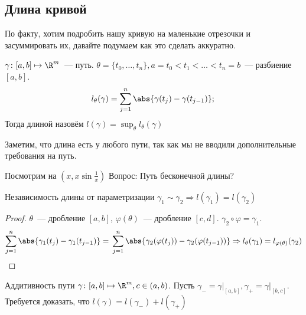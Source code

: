 \subsection{Длина кривой}
По факту, хотим подробить нашу кривую на маленькие отрезочки
и засуммировать их, давайте подумаем как это сделать аккуратно.\\
\quad
\begin{definition}
    $\gamma\colon [a, b]\mapsto \R^m$~--- путь.
    $\theta = \{t_0,\dots, t_n\}, a = t_0 < t_1 < \dots < t_n = b$~---
    разбиение $[a, b]$.
    \[
        l_\theta(\gamma) = \sum\limits_{j = 1}^{n} \abs{\gamma(t_j) - \gamma(t_{j - 1})};\\
    \]
    Тогда длиной назовём  $l(\gamma) = \sup_\theta l_\theta(\gamma)$
\end{definition}
\begin{remark}
    Заметим, что длина есть у любого пути, так как мы не вводили
    дополнительные требования на путь.
\end{remark}
\begin{remark}
    Посмотрим на $(x, x\sin \frac{1}{x})$
    Вопрос: Путь бесконечной длины?
\end{remark}
\begin{namedtheorem}{Независимость длины от параметризации}
    $\gamma_1 \sim \gamma_2\Rightarrow l(\gamma_1) = l(\gamma_2)$
\end{namedtheorem}
\begin{proof}
    $\theta$~--- дробление $[a,b]$,
    $\varphi(\theta)$~--- дробление $[c,d]$.
    $\gamma_2\circ\varphi=\gamma_1$.
    \[
        \sum\limits_{j = 1}^{n}\abs{\gamma_1(t_j) - \gamma_1(t_{j-1})}=\\
        \sum\limits_{j=1}^{n}\abs{\gamma_2(\varphi(t_j))-\gamma_2(\varphi(t_{j-1}))}
        \Rightarrow
        l_{\theta}(\gamma_1) = l_{\varphi(\theta)}(\gamma_2)
    \]
\end{proof}
\begin{namedtheorem}{Аддитивность пути}
    $\gamma\colon [a,b]\mapsto\R^m, c\in(a,b)$.
    Пусть $\gamma_{-}=\gamma\big|_{[a,b]}, \gamma_{+} = \gamma\big|_{[b,c]}$.
    Требуется доказать, что $l(\gamma)=l(\gamma_-) + l(\gamma_+)$
\end{namedtheorem}
